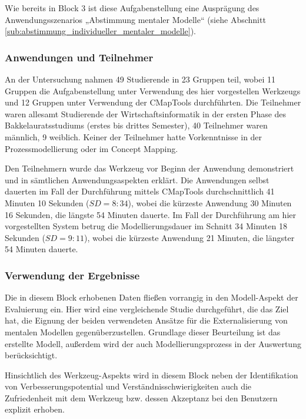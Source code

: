 Wie bereits in Block 3 ist diese Aufgabenstellung eine Ausprägung des Anwendungsszenarios „Abstimmung mentaler Modelle“ (siehe Abschnitt \ref{sub:abstimmung_individueller_mentaler_modelle}).


\subsubsection{Anwendungen und Teilnehmer} %
\label{ssub:5_teilnehmer}

An der Untersuchung nahmen 49 Studierende in 23 Gruppen teil, wobei 11 Gruppen die Aufgabenstellung unter Verwendung des hier vorgestellen Werkzeugs und 12 Gruppen unter Verwendung der CMapTools durchführten. Die Teilnehmer waren allesamt Studierende der Wirtschaftsinformatik in der ersten Phase des Bakkelauratsstudiums (erstes bis drittes Semester), 40 Teilnehmer waren männlich, 9 weiblich. Keiner der Teilnehmer hatte Vorkenntnisse in der Prozessmodellierung oder im Concept Mapping.

Den Teilnehmern wurde das Werkzeug vor Beginn der Anwendung demonstriert und in sämtlichen Anwendungsaspekten erklärt. Die Anwendungen selbst dauerten im Fall der Durchführung mittels CMapTools durchschnittlich 41 Minuten 10 Sekunden ($SD=8:34$), wobei die kürzeste Anwendung 30 Minuten 16 Sekunden, die längste 54 Minuten dauerte. Im Fall der Durchführung am hier vorgestellten System betrug die Modellierungsdauer im Schnitt 34 Minuten 18 Sekunden ($SD=9:11$), wobei die kürzeste Anwendung 21 Minuten, die längster 54 Minuten dauerte.


\subsubsection{Verwendung der Ergebnisse} %
\label{ssub:5_verwendung_der_ergebnisse}

Die in diesem Block erhobenen Daten fließen vorrangig in den Modell-Aspekt der Evaluierung ein. Hier wird eine vergleichende Studie durchgeführt, die das Ziel hat, die Eignung der beiden verwendeten Ansätze für die Externalisierung von mentalen Modellen gegenüberzustellen. Grundlage dieser Beurteilung ist das erstellte Modell, außerdem wird der auch Modellierungsprozess in der Auswertung berücksichtigt.

Hinsichtlich des Werkzeug-Aspekts wird in diesem Block neben der Identifikation von Verbesserungspotential und Verständnisschwierigkeiten auch die Zufriedenheit mit dem Werkzeug bzw. dessen Akzeptanz bei den Benutzern explizit erhoben. 

